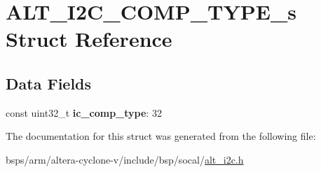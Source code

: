 \hypertarget{structALT__I2C__COMP__TYPE__s}{}\section{A\+L\+T\+\_\+\+I2\+C\+\_\+\+C\+O\+M\+P\+\_\+\+T\+Y\+P\+E\+\_\+s Struct Reference}
\label{structALT__I2C__COMP__TYPE__s}
\subsection*{Data Fields}
\begin{DoxyCompactItemize}
\item 
\mbox{\label{structALT__I2C__COMP__TYPE__s_a3e4063926ab2261beb4eb27d67e2476f}} 
const uint32\+\_\+t {\bfseries ic\+\_\+comp\+\_\+type}\+: 32
\end{DoxyCompactItemize}


The documentation for this struct was generated from the following file\+:\begin{DoxyCompactItemize}
\item 
bsps/arm/altera-\/cyclone-\/v/include/bsp/socal/\mbox{\hyperlink{socal_2alt__i2c_8h}{alt\+\_\+i2c.\+h}}\end{DoxyCompactItemize}
